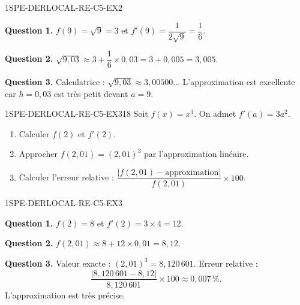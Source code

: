 
\begin{corrige}{1SPE-DERLOCAL-RE-C5-EX2}

\textbf{Question 1.}
$f(9) = \sqrt{9} = 3$ et $f'(9) = \dfrac{1}{2\sqrt{9}} = \dfrac{1}{6}$.


\textbf{Question 2.}
$\sqrt{9{,}03} \approx 3 + \dfrac{1}{6} \times 0{,}03 = 3 + 0{,}005 = 3{,}005.$

\textbf{Question 3.}
Calculatrice : $\sqrt{9{,}03} \approx 3{,}00500\ldots$ L'approximation est excellente car $h = 0{,}03$ est très petit devant $a = 9$.

\end{corrige}


\begin{exercice}{1SPE-DERLOCAL-RE-C5-EX3}{1}{8}
Soit $f(x) = x^3$. On admet $f'(a) = 3a^2$.
\begin{enumerate}
  \item Calculer $f(2)$ et $f'(2)$.
  \item Approcher $f(2{,}01) = (2{,}01)^3$ par l'approximation linéaire.
  \item Calculer l'erreur relative : $\dfrac{|f(2{,}01) - \text{approximation}|}{f(2{,}01)} \times 100$.
\end{enumerate}
\end{exercice}


\begin{corrige}{1SPE-DERLOCAL-RE-C5-EX3}

\textbf{Question 1.}
$f(2) = 8$ et $f'(2) = 3 \times 4 = 12$.

\textbf{Question 2.}
$f(2{,}01) \approx 8 + 12 \times 0{,}01 = 8{,}12.$

\textbf{Question 3.}
Valeur exacte : $(2{,}01)^3 = 8{,}120\,601$. Erreur relative :
\[
\frac{|8{,}120\,601 - 8{,}12|}{8{,}120\,601} \times 100 \approx 0{,}007\,\%.
\]
L'approximation est très précise.

\end{corrige}
